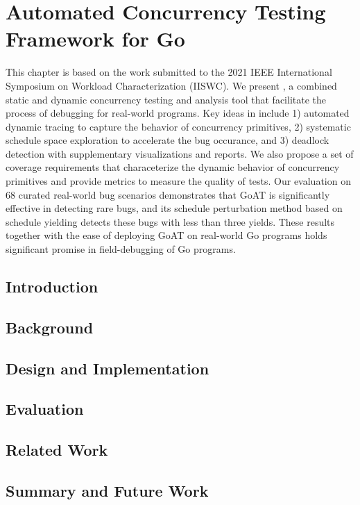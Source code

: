 
\chapter{Automated Concurrency Testing Framework for Go}
\label{sec:ch4}

This chapter is based on the work submitted to the 2021 IEEE International Symposium on Workload Characterization (IISWC).
We present \goat, a combined static and dynamic concurrency testing
and analysis tool that facilitate the process of debugging for real-world programs.
%
Key ideas in \goat include
1) automated dynamic tracing to capture the behavior of concurrency primitives,
2) systematic schedule space exploration to accelerate the bug occurance,
and 3) deadlock detection with supplementary visualizations and reports.
We also propose a set of coverage requirements that characeterize the dynamic behavior of concurrency primitives and provide metrics to measure the quality of tests.
%
Our evaluation on 68 curated real-world bug scenarios
demonstrates that GoAT is significantly effective in detecting
rare bugs, and its schedule perturbation method based on schedule
yielding detects these bugs with less than three yields.
%
These results together with the ease of deploying GoAT on real-world
Go programs holds significant promise in field-debugging of Go programs.

\section{Introduction}
\label{sec:ch4_intro}



\section{Background}
\label{sec:ch4_bg}


\section{Design and Implementation}
\label{sec:ch4_design}


\section{Evaluation}
\label{sec:ch4_evaluation}


%


\section{Related Work}
\label{sec:ch4_related}



\section{Summary and Future Work}
\label{sec:ch4_summary}

